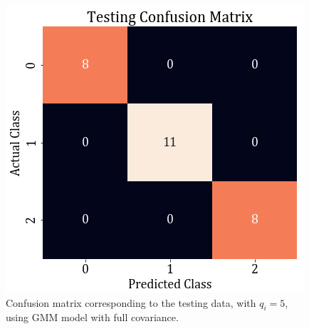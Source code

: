 \documentclass[11pt,a4paper]{article}
\begin{document}
\begin{figure}[H]
    \centering
    \includegraphics[scale=0.5]{images/1b_full_test_conf.png}
    \caption{Confusion matrix corresponding to the testing data, with $q_i=5$, using GMM model with full covariance.}
\end{figure}
\end{document}
